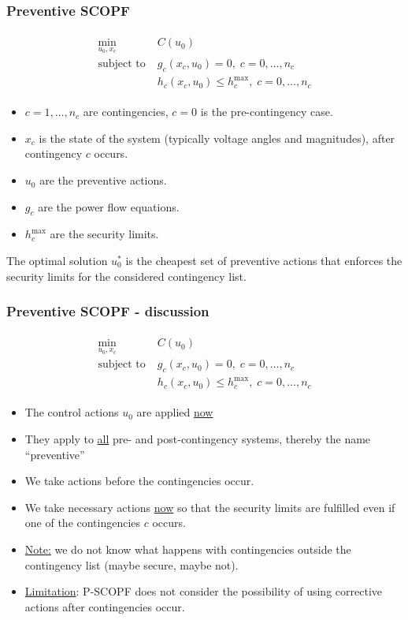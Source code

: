 \documentclass[compress]{beamer}
\begin{document}
\begin{frame}
  \frametitle{Preventive SCOPF}
  \begin{align}
\label{eq:2}\tag{P-SCOPF}
    \begin{split}
    \min_{u_0,x_c} \; & C(u_0) \\
    \text{subject to} \; & g_c(x_c,u_0) = 0, \; c = 0,\ldots,n_c \\
    & h_c(x_c,u_0) \leq h_c^{\text{max}}, \; c = 0,\ldots,n_c
    \end{split}
  \end{align}
  \begin{itemize}
  \item $c=1,\ldots,n_c$ are contingencies, $c=0$ is the pre-contingency case.
  \item $x_c$ is the state of the system (typically voltage angles and magnitudes), after contingency $c$ occurs.
  \item $u_0$ are the preventive actions.
  \item $g_c$ are the power flow equations.
  \item $h_c^\text{max}$ are the security limits.
  \end{itemize}
The optimal solution $u_0^{*}$ is the cheapest set of preventive actions that enforces the security limits for the considered contingency list.
\end{frame}

\begin{frame}
  \frametitle{Preventive SCOPF - discussion}
  \begin{align}
\label{eq:2}\tag{P-SCOPF}
    \begin{split}
    \min_{u_0,x_c} \; & C(u_0) \\
    \text{subject to} \; & g_c(x_c,u_0) = 0, \; c = 0,\ldots,n_c \\
    & h_c(x_c,u_0) \leq h_c^{\text{max}}, \; c = 0,\ldots,n_c
    \end{split}
  \end{align}
  \begin{itemize}
  \item The control actions $u_0$ are applied \underline{now} 
  \item They apply to \underline{all} pre- and post-contingency systems, thereby the name ``preventive''
  \item We take actions before the contingencies occur.
  \item We take necessary actions \underline{now} so that the security limits are fulfilled even if one of the contingencies $c$ occurs.
  \item \underline{Note:} we do not know what happens with contingencies outside the contingency list (maybe secure, maybe not).
  \item \underline{Limitation}: P-SCOPF does not consider the possibility of using corrective actions after contingencies occur.
  \end{itemize}
\end{frame}
\end{document}
